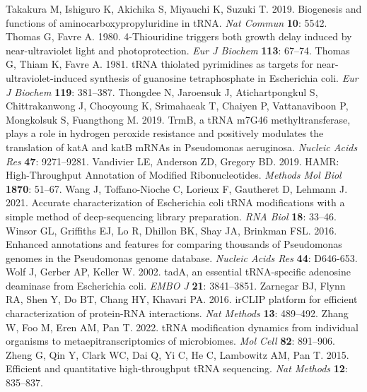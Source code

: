 \documentclass[times, twoside]{zHenriquesLab-StyleBioRxiv}
\begin{document}
\newline
\newline
Takakura M, Ishiguro K, Akichika S, Miyauchi K, Suzuki T. 2019. Biogenesis and functions of aminocarboxypropyluridine in tRNA. \textit{Nat Commun} \textbf{10}: 5542. 
\newline
\newline
Thomas G, Favre A. 1980. 4-Thiouridine triggers both growth delay induced by near-ultraviolet light and photoprotection. \textit{Eur J Biochem} \textbf{113}: 67–74. 
\newline
\newline
Thomas G, Thiam K, Favre A. 1981. tRNA thiolated pyrimidines as targets for near-ultraviolet-induced synthesis of guanosine tetraphosphate in Escherichia coli. \textit{Eur J Biochem} \textbf{119}: 381–387. 
\newline
\newline
Thongdee N, Jaroensuk J, Atichartpongkul S, Chittrakanwong J, Chooyoung K, Srimahaeak T, Chaiyen P, Vattanaviboon P, Mongkolsuk S, Fuangthong M. 2019. TrmB, a tRNA m7G46 methyltransferase, plays a role in hydrogen peroxide resistance and positively modulates the translation of katA and katB mRNAs in Pseudomonas aeruginosa. \textit{Nucleic Acids Res} \textbf{47}: 9271–9281. 
\newline
\newline
Vandivier LE, Anderson ZD, Gregory BD. 2019. HAMR: High-Throughput Annotation of Modified Ribonucleotides. \textit{Methods Mol Biol} \textbf{1870}: 51–67. 
\newline
\newline
Wang J, Toffano-Nioche C, Lorieux F, Gautheret D, Lehmann J. 2021. Accurate characterization of Escherichia coli tRNA modifications with a simple method of deep-sequencing library preparation. \textit{RNA Biol} \textbf{18}: 33–46. 
\newline
\newline
Winsor GL, Griffiths EJ, Lo R, Dhillon BK, Shay JA, Brinkman FSL. 2016. Enhanced annotations and features for comparing thousands of Pseudomonas genomes in the Pseudomonas genome database. \textit{Nucleic Acids Res} \textbf{44}: D646-653. 
\newline
\newline
Wolf J, Gerber AP, Keller W. 2002. tadA, an essential tRNA-specific adenosine deaminase from Escherichia coli. \textit{EMBO J} \textbf{21}: 3841–3851. 
\newline
\newline
Zarnegar BJ, Flynn RA, Shen Y, Do BT, Chang HY, Khavari PA. 2016. irCLIP platform for efficient characterization of protein-RNA interactions. \textit{Nat Methods} \textbf{13}: 489–492. 
\newline
\newline
Zhang W, Foo M, Eren AM, Pan T. 2022. tRNA modification dynamics from individual organisms to metaepitranscriptomics of microbiomes. \textit{Mol Cell} \textbf{82}: 891–906. 
\newline
\newline
Zheng G, Qin Y, Clark WC, Dai Q, Yi C, He C, Lambowitz AM, Pan T. 2015. Efficient and quantitative high-throughput tRNA sequencing. \textit{Nat Methods} \textbf{12}: 835–837. 


\onecolumn
\newpage

\newpage
\end{document}
